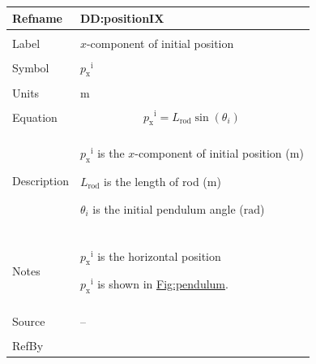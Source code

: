 \documentclass[12pt]{article}
\begin{document}
\vspace{\baselineskip}
\noindent
\begin{minipage}{\textwidth}
\begin{tabular}{>{\raggedright}p{}>{\raggedright\arraybackslash}p{}}
\toprule \textbf{Refname} & \textbf{DD:positionIX}
\label{DD:positionIX}
\\ \midrule \\
Label & $x$-component of initial position
        
\\ \midrule \\
Symbol & ${{p_{\text{x}}}^{\text{i}}}$
         
\\ \midrule \\
Units & ${\text{m}}$
        
\\ \midrule \\
Equation & \begin{displaymath}
           {{p_{\text{x}}}^{\text{i}}}={L_{\text{rod}}} \sin\left({θ_{i}}\right)
           \end{displaymath}
\\ \midrule \\
Description & \begin{symbDescription}
              \item{${{p_{\text{x}}}^{\text{i}}}$ is the $x$-component of initial position (${\text{m}}$)}
              \item{${L_{\text{rod}}}$ is the length of rod (${\text{m}}$)}
              \item{${θ_{i}}$ is the initial pendulum angle (${\text{rad}}$)}
              \end{symbDescription}
\\ \midrule \\
Notes & ${{p_{\text{x}}}^{\text{i}}}$ is the horizontal position
        
        ${{p_{\text{x}}}^{\text{i}}}$ is shown in \hyperref[Figure:pendulum]{Fig:pendulum}.
        
\\ \midrule \\
Source & --
         
\\ \midrule \\
RefBy & 
\\ \bottomrule
\end{tabular}
\end{minipage}
\end{document}
